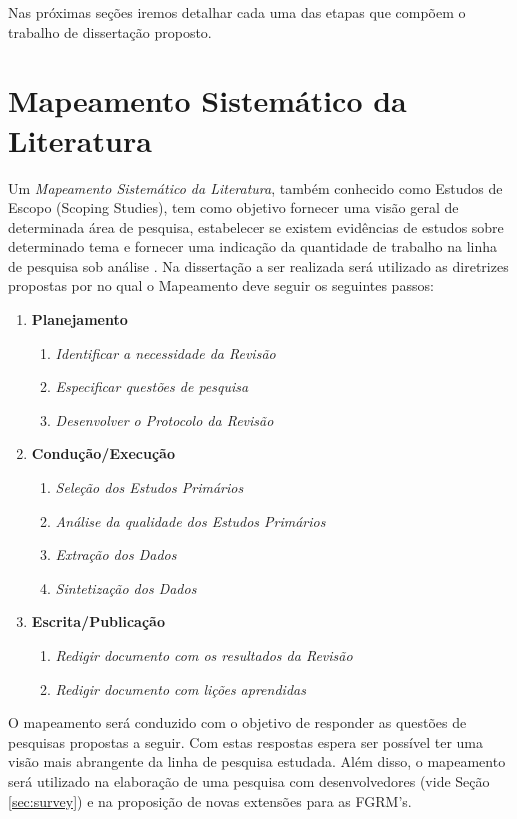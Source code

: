\documentclass[msc,proposal,hidelot,hideabstract]{ppgccufmg} %
\begin{document}
Nas próximas seções iremos detalhar cada uma das etapas que compõem o trabalho de dissertação proposto.

\section{Mapeamento Sistemático da Literatura}
\label{sec:revisao_sistematica}

Um \textit{Mapeamento Sistemático da Literatura}, também conhecido como Estudos de Escopo (Scoping Studies), tem como objetivo fornecer uma visão geral de determinada área de pesquisa, estabelecer se existem evidências de estudos sobre determinado tema e fornecer uma indicação da quantidade de trabalho na linha de pesquisa sob análise \cite{keele2007guidelines,wohlin2012experimentation}. Na dissertação a ser realizada será utilizado as diretrizes propostas por \cite{keele2007guidelines} no qual o Mapeamento deve seguir os seguintes passos:

\begin{enumerate}
  \item \textbf{Planejamento}
  \begin{enumerate}
    \item \textit{Identificar a necessidade da Revisão}
    \item \textit{Especificar questões de pesquisa}
    \item \textit{Desenvolver o Protocolo da Revisão}
  \end{enumerate}
  \item \textbf{Condução/Execução}
  \begin{enumerate}
    \item \textit{Seleção dos Estudos Primários}
    \item \textit{Análise da qualidade dos Estudos Primários}
     \item \textit{Extração dos Dados}
     \item \textit{Sintetização dos Dados}
   \end{enumerate}
  \item \textbf{Escrita/Publicação}
  \begin{enumerate}
    \item \textit{Redigir documento com os resultados da Revisão}
    \item \textit{Redigir documento com lições aprendidas}
  \end{enumerate}
\end{enumerate}

O mapeamento será conduzido com o objetivo de responder as questões de pesquisas propostas a seguir. Com estas respostas espera ser possível ter uma visão mais abrangente da linha de pesquisa estudada. Além disso, o mapeamento será utilizado na elaboração de uma pesquisa com desenvolvedores (vide Seção \ref{sec:survey}) e na proposição de novas extensões para as FGRM's.
\end{document}
